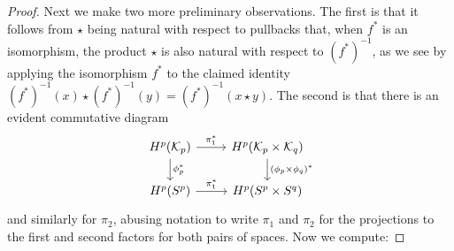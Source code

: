 \begin{proof}
	Next we make two more preliminary observations.
	The first is that it follows from $\star$ being natural with respect to pullbacks that, when $f^*$ is an isomorphism, the product $\star$ is also natural with respect to $(f^*)^{-1}$, as we see by applying the isomorphism $f^*$ to the claimed identity $(f^*)^{-1}(x)\star (f^*)^{-1}(y) = (f^*)^{-1}(x\star y)$.
	The second is that there is an evident commutative diagram
	\begin{equation}\label{D: projections}
		\begin{tikzcd}
			H^p(\mc K_p) \arrow{r}{\pi_1^*} \arrow[d, "\phi_p^*"] &
			H^p(\mc K_p \times \mc K_q) \arrow[d, "(\phi_p \times \phi_q)^*"] \\
			H^p(S^p) \arrow{r}{\pi_1^*} & H^p(S^p \times S^q)
		\end{tikzcd}
	\end{equation}
	and similarly for $\pi_2$, abusing notation to write $\pi_1$ and $\pi_2$ for the projections to the first and second factors for both pairs of spaces.
	Now we compute:
	\begin{comment}
		Now, we consider the diagram
		\begin{diagram}
			H^{p+q}(M)&\lTo^{\diag^*(\bar \alpha \times \bar \beta)^*}& H^{p+q}(\mc K_p \times \mc K_q)&\lTo^{\mu^*}&H^{p+q}(\mc K_{p+q})\\
			&&\dTo^{(\phi_p \times \phi_q)^*}&&\dTo^{\phi_{p+q}}\\
			&&H^{p+q}(S^p \times S^q)&\lTo^{\nu^*}&H^{p+q}(S^{p+q}).
		\end{diagram}
		As the $p+1$ skeleton of $K_p$ can be taken to be the image of $S^p$ under $\phi_p$, it is standard that the vertical maps are isomorphisms.


\end{comment}
\end{proof}
